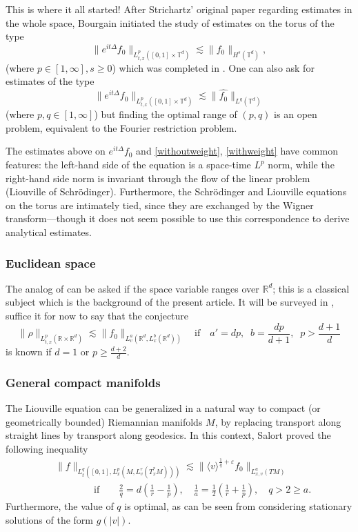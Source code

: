 \documentclass[11pt,a4paper,reqno]{amsart}
\theoremstyle{plain}
\theoremstyle{remark}
\begin{document}
This is where it all started! After Strichartz' original paper \cite{Strichartz} regarding estimates in the whole space, Bourgain \cite{Bourgain} initiated the study of estimates on the torus of the type
\[
    \| e^{it\Delta} f_0 \|_{L^p_{t,x}([0,1] \times \mathbb{T}^d)} \lesssim \| f_0 \|_{H^s(\mathbb{T}^d)},
\]
(where $p \in [1,\infty], s\geq 0$) which was completed in \cite{BourgainDemeter}. One can also ask for estimates of the type
\[
    \| e^{it\Delta} f_0 \|_{L^p_{t,x}([0,1] \times \mathbb{T}^d)} \lesssim \| \widehat{f_0} \|_{L^q(\mathbb{T}^d)}
\]
(where $p,q \in [1,\infty]$) but finding the optimal range of $(p,q)$ is an open problem, equivalent to the Fourier restriction problem.

The estimates above on $e^{it\Delta} f_0$ and \eqref{withoutweight}, \eqref{withweight} have common features: the left-hand side of the equation is a space-time $L^p$ norm, while the right-hand side norm is invariant through the flow of the linear problem (Liouville of Schr\"odinger). Furthermore, the Schr\"odinger and Liouville equations on the torus are intimately tied, since they are exchanged by the Wigner transform---though it does not seem possible to use this correspondence to derive analytical estimates.

\subsubsection{Euclidean space} 

The analog of  can be asked if the space variable ranges over $\mathbb{R}^d$; this is a classical subject which is the background of the present article. It will be surveyed in , suffice it for now to say that the conjecture
\[
    \| \rho \|_{L^p_{t,x}(\mathbb{R} \times \mathbb{R}^d)} \lesssim \| f_0 \|_{L^a_v (\mathbb{R}^d, L^b_x(\mathbb{R}^d))} \quad \mbox{if} \quad  
a'=dp, \;\; b = \frac {dp}{d+1}, \;\; p > \frac{d+1}{d}
\]
is known if $d=1$ or $p \geq \frac{d+2}{d}$.

\subsubsection{General compact manifolds} 

The Liouville equation can be generalized in a natural way to compact (or geometrically bounded) Riemannian manifolds $M$, by replacing transport along straight lines by transport along geodesics. In this context, Salort \cite{Salort2007} proved the following inequality
\begin{align*}
    & \|f\|_{L_t^q([0,1],L^p_x(M,L^r_v(T^*_xM)))} \lesssim \|\langle v\rangle^{\frac{1}{q} + \varepsilon}f_0\|_{L^a_{x,v}(TM)} \\
    & \qquad \qquad \mbox{if} \qquad  \frac{2}{q} = d\left(\frac{1}{r} - \frac{1}{p}\right), \quad \frac{1}{a} = \frac{1}{2}\left(\frac{1}{r} + \frac{1}{p}\right), \quad q>2\geq a.
\end{align*}
Furthermore, the value of $q$ is optimal, as can be seen from considering stationary solutions of the form $g(|v|)$.
\end{document}
